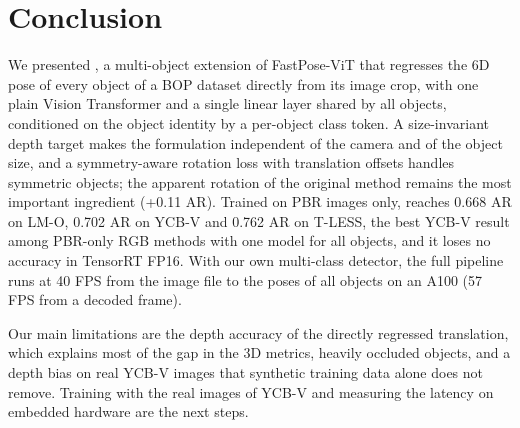 \section{Conclusion}
\label{sec:conclusion}

We presented \ours{}, a multi-object extension of FastPose-ViT that regresses the 6D pose of every
object of a BOP dataset directly from its image crop, with one plain Vision Transformer and a
single linear layer shared by all objects, conditioned on the object identity by a per-object
class token. A size-invariant depth target makes the formulation independent of the camera and of
the object size, and a symmetry-aware rotation loss with translation offsets handles symmetric
objects; the apparent rotation of the original method remains the most important ingredient
(+0.11 AR). Trained on PBR images only, \ours{} reaches 0.668 AR on LM-O, 0.702 AR on YCB-V and 0.762 AR
on T-LESS, the best YCB-V result among PBR-only RGB methods with one model for all objects, and it loses no
accuracy in TensorRT FP16. With our own multi-class detector, the full pipeline runs at 40 FPS
from the image file to the poses of all objects on an A100 (57 FPS from a decoded frame).

Our main limitations are the depth accuracy of the directly regressed translation, which explains
most of the gap in the 3D metrics, heavily occluded objects, and a depth bias on real YCB-V
images that synthetic training data alone does not remove. Training with the real images of
YCB-V and measuring the latency on embedded hardware are the next steps.

